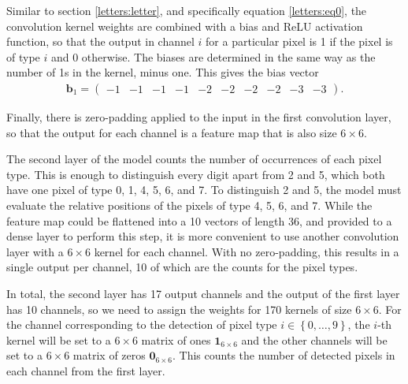 \documentclass{somasmsc}
\begin{document}
Similar to section \ref{letters:letter}, and specifically equation \ref{letters:eq0}, the convolution kernel weights are combined with a bias and ReLU activation function, so that the output in channel $i$ for a particular pixel is 1 if the pixel is of type $i$ and 0 otherwise. The biases are determined in the same way as the number of 1s in the kernel, minus one. This gives the bias vector
\begin{align*}
    \pmb{b}_1 =
    \begin{pmatrix}
        -1 & -1 & -1 & -1 & -2 & -2 & -2 & -2 & -3 & -3
    \end{pmatrix}.
\end{align*}

Finally, there is zero-padding applied to the input in the first convolution layer, so that the output for each channel is a feature map that is also size $6 \times 6$.

The second layer of the model counts the number of occurrences of each pixel type. This is enough to distinguish every digit apart from 2 and 5, which both have one pixel of type 0, 1, 4, 5, 6, and 7. To distinguish 2 and 5, the model must evaluate the relative positions of the pixels of type 4, 5, 6, and 7. While the feature map could be flattened into a 10 vectors of length 36, and provided to a dense layer to perform this step, it is more convenient to use another convolution layer with a $6 \times 6$ kernel for each channel. With no zero-padding, this results in a single output per channel, 10 of which are the counts for the pixel types.

In total, the second layer has 17 output channels and the output of the first layer has 10 channels, so we need to assign the weights for 170 kernels of size $6 \times 6$. For the channel corresponding to the detection of pixel type $i \in \left\{0, \dots, 9\right\}$, the $i$-th kernel will be set to a $6 \times 6$ matrix of ones $\mathbf{1}_{6 \times 6}$ and the other channels will be set to a $6 \times 6$ matrix of zeros $\mathbf{0}_{6 \times 6}$. This counts the number of detected pixels in each channel from the first layer.
\end{document}
